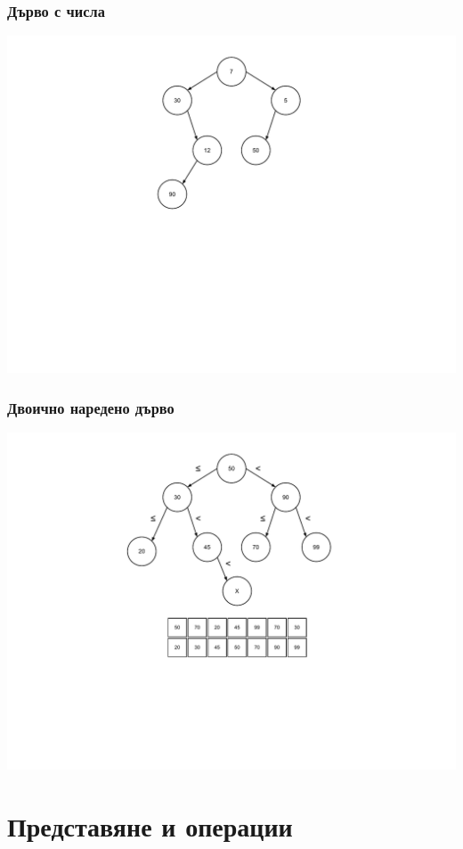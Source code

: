 \documentclass{beamer}
\begin{document}
\begin{frame}[fragile]
\frametitle{Дърво с числа}

\includegraphics[width=14cm]{images/tree_arbitrary}

\end{frame}


\begin{frame}[fragile]
\frametitle{Двоично наредено дърво}

\includegraphics[width=14cm]{images/tree_bot}

\end{frame}

\section{Представяне и операции} 
\end{document}
